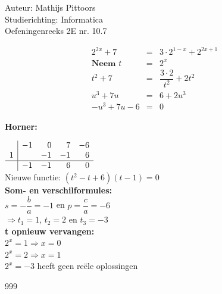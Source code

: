 \documentclass[a4paper]{article}
\begin{document}
  
\noindent \large Auteur: Mathijs Pittoors \\
\noindent \large Studierichting: Informatica\\
\noindent \large Oefeningenreeks 2E nr. 10.7\\

\medskip

\normalsize

\begin{eqnarray*}
    2^{2x} + 7 &=& 3 \cdot 2^{1-x} + 2^{2x+1} \\
    \textbf{Neem } t & = &2^x\\
    t^2 + 7 & = & \dfrac{3 \cdot 2}{t^2} + 2t^2\\
    u^3 + 7u & = & 6 + 2u^3\\
    -u^3 + 7u -6 & = & 0
\end{eqnarray*}

\textbf{Horner:\\}

$\begin{array}{r|r r r r}
    & -1 & 0 & 7 & -6\\
   1&    &-1 &-1 &  6\\ \hline
    & -1 & -1& 6 & 0
\end{array}$ \\

Nieuwe functie: $(t^2-t+6)(t-1) = 0$\\

\textbf{Som- en verschilformules:}\\

$s= -\dfrac{b}{a} = -1$ en $p = \dfrac{c}{a} = -6$\\

$\Rightarrow t_1 = 1$, $t_2 = 2$ en $t_3 = -3$\\

\textbf{t opnieuw vervangen:}\\

$2^x = 1 \Rightarrow x = 0$\\

$2^x = 2 \Rightarrow x = 1$\\

$2^x = -3$ heeft geen reële oplossingen




\begin{thebibliography}{999}
\end{thebibliography}
\end{document}
